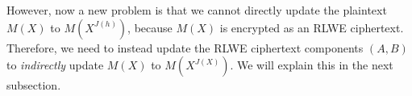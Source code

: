 \begin{comment}
$ $

$ =  \bm{(}\text{ } M( \omega^{5^h} ), \text{ } M( \omega^{5^{1+h}}), \text{ } M( \omega^{5^{2+h}}), \cdots, \text{ } M( \omega^{5^{\frac{n}{2}-1+h}}), \text{ } M(\overline{\omega}^{5^{\frac{n}{2}-1+h}} ),  \cdots, M( \overline\omega^{5^{1+h}} ), \text{ } M( \overline\omega^{5^{h}} ) \text{ }\bm{)} $

$ $

$ =  \bm{(}\text{ } M( \omega^{5^h} ), \text{ } M( \omega^{5^{1+h}}), \text{ } M( \omega^{5^{2+h}}), \cdots, \text{ } M( \omega^{5^{h-1}}), \text{ } M(\overline{\omega}^{5^{h-1}} ),  \cdots, M( \overline\omega^{5^{1+h}} ), \text{ } M( \overline\omega^{5^{h}} ) \text{ }\bm{)} $ 

\textcolor{red}{\# since $5^{\frac{n}{2}} \bmod 2n = 1$}

$ $

Since the above vector is a Hermitian vector, we will remove its second half (i.e., conjugates of the first half) to retrieve the original input vector, which gives us the following:


$ \bm{(}\text{ } M( \omega^{5^h} ), \text{ } M( \omega^{5^{1+h}}), \text{ } M( \omega^{5^{2+h}}), \cdots, \text{ } M( \omega^{5^{\frac{n}{2}-2}}) \text{ } M( \omega^{5^{\frac{n}{2}-1}}), \text{ } M( \omega^{5^{0}}), \text{ } M( \omega^{5^{1}}), \cdots, M( \omega^{5^{h-1}}) \text{ }\bm{)} $

$ $

$ = \bm{(}\text{ } M(\omega^{J(h)}), \text{ } M(\omega^{J(h+1)}), \cdots, \text{ } M(\omega^{J(\frac{n}{2}-2)}), \text{ } M(\omega^{J(\frac{n}{2}-1)}), \text{ } M(\omega^{J(0)}), \text{ } M(\omega^{J(1)}), \cdots, \text{ } M(\omega^{J(h-1)})  \text{ }\bm{)}$

$ $

$= \vec{v}^{\langle h \rangle}$

$ $

In conclusion, given the modified encoding matrix $\hathat W$ and modified decoding matrix $\hathat W^*$, rotating all elements of the input vector $\vec{v}$ by $h$ positions to the left is equivalent to updating the plaintext polynomial $M(X)$ to $M(X^{J(h)})$. 
\end{comment}


However, now a new problem is that we cannot directly update the plaintext $M(X)$ to $M(X^{J(h)})$, because $M(X)$ is encrypted as an RLWE ciphertext. Therefore, we need to instead update the RLWE ciphertext components $(A, B)$ to \textit{indirectly} update $M(X)$ to $M(X^{J(X)})$. We will explain this in the next subsection. 


